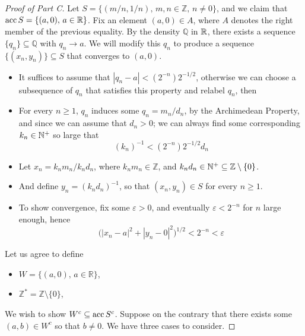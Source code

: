 \documentclass[../../main.tex]{subfiles}
\begin{document}
\begin{proof}[Proof of Part C]
    Let $S=\{(m/n,1/n),\,m,n\in\mathbb{Z},\,n\neq 0\}$, and we claim that $\operatorname{acc}{S}=\{(a,0),\,a\in\mathbb{R}\}$. Fix an element  $(a,0)\in A$, where $A$ denotes the right member of the previous equality. By the density $\mathbb{Q}$ in $\mathbb{R}$, there exists a sequence $\{q_n\}\subseteq \mathbb{Q}$ with $q_n\to a$. We will modify this $q_n$ to produce a sequence $\{(x_n,y_n)\}\subseteq S$ that converges to $(a,0)$.
    \begin{itemize}
        \item It suffices to assume that $|q_n-a|<(2^{-n})2^{-1/2}$, otherwise we can choose a subsequence of $q_n$ that satisfies this property and relabel $q_n$, then
        \item For every $n\geq 1$, $q_n$ induces some $q_n=m_n/d_n$, by the Archimedean Property, and since we can assume that $d_n>0$; we can always find some corresponding $k_n\in\mathbb{N}^+$ so large that
        \[
            (k_n)^{-1}<(2^{-n})2^{-1/2}d_n
        \]
        \item Let $x_n = k_nm_n/k_nd_n$, where $k_nm_n\in\mathbb{Z}$, and $k_nd_n\in\mathbb{N}^+\subseteq\mathbb{Z}\setminus\{0\}$.
        \item And define $y_n=(k_nd_n)^{-1}$, so that $(x_n,y_n)\in S$ for every $n\geq 1$.
        \item To show convergence, fix some $\varepsilon>0$, and eventually $\varepsilon<2^{-n}$ for $n$ large enough, hence
        \[
            \biggl(|x_n-a|^2+|y_n-0|^2\biggr)^{1/2}<2^{-n}<\varepsilon
        \]
    \end{itemize}
    Let us agree to define 
    \begin{itemize}
        \item $W = \{(a,0),\,a\in\mathbb{R}\}$, 
        \item $\mathbb{Z}^*=\mathbb{Z}\setminus\{0\}$,
    \end{itemize}
    We wish to show $W^c\subseteq \operatorname{acc}{S}^c$. Suppose on the contrary that there exists some $(a,b)\in W^c$ so that $b\neq 0$. We have three cases to consider.
    

\end{proof}
\end{document}
